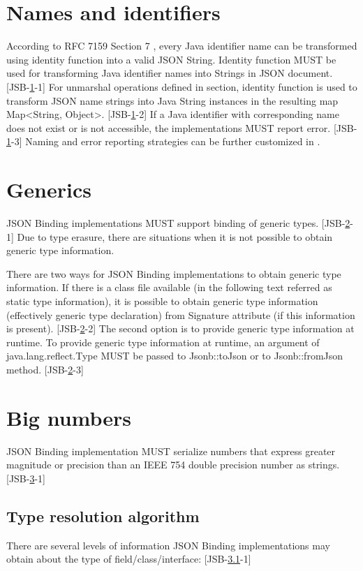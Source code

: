 \section{Names and identifiers}
\label{sec:naming}
According to RFC 7159 Section 7 \cite{rfc7159}, every Java identifier name can be transformed using identity function into a valid JSON String. Identity function MUST be used for transforming Java identifier names into Strings in JSON document. [JSB-\ref{sec:naming}-1]
For unmarshal operations defined in  section, identity function is used to transform JSON name strings into Java String instances in the resulting map Map\textless String, Object\textgreater. [JSB-\ref{sec:naming}-2] If a Java identifier with corresponding name does not exist or is not accessible, the implementations MUST report error. [JSB-\ref{sec:naming}-3] Naming and error reporting strategies can be further customized in .

\section{Generics}
\label{sec:generics}
JSON Binding implementations MUST support binding of generic types. [JSB-\ref{sec:generics}-1] Due to type erasure, there are situations when it is not possible to obtain generic type information.

There are two ways for JSON Binding implementations to obtain generic type information. If there is a class file available (in the following text referred as static type information), it is possible to obtain generic type information (effectively generic type declaration) from Signature attribute (if this information is present). [JSB-\ref{sec:generics}-2] The second option is to provide generic type information at runtime. To provide generic type information at runtime, an argument of java.lang.reflect.Type MUST be passed to Jsonb::toJson or to Jsonb::fromJson method. [JSB-\ref{sec:generics}-3]

\section{Big numbers}
\label{sec:big_numbers}
JSON Binding implementation MUST serialize numbers that express greater magnitude or precision than an IEEE 754 double precision number as strings. [JSB-\ref{sec:big_numbers}-1]

\subsection{Type resolution algorithm}
\label{sec:type_resolution_algorithm}
There are several levels of information JSON Binding implementations may obtain about the type of field/class/interface: [JSB-\ref{sec:type_resolution_algorithm}-1]

